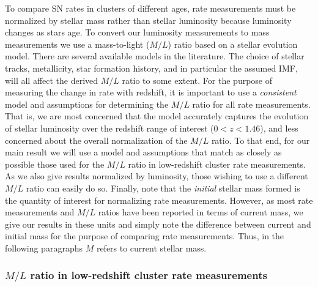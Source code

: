 
To compare SN rates in clusters of different ages, rate measurements
must be normalized by stellar mass rather than stellar luminosity
because luminosity changes as stars age. To convert our luminosity
measurements to mass measurements we use a mass-to-light ($M/L$) ratio
based on a stellar evolution model. There are several available models
in the literature. The choice of stellar tracks, metallicity, star
formation history, and in particular the assumed IMF, will all affect
the derived $M/L$ ratio to some extent. For the purpose of measuring
the change in rate with redshift, it is important to use a
\emph{consistent} model and assumptions for determining the $M/L$
ratio for all rate measurements. That is, we are most concerned that
the model accurately captures the evolution of stellar luminosity over
the redshift range of interest ($0<z<1.46$), and less concerned about
the overall normalization of the $M/L$ ratio. To that end, for our
main result we will use a model and assumptions that match as closely
as possible those used for the $M/L$ ratio in low-redshift cluster
rate measurements. As we also give results normalized by luminosity,
those wishing to use a different $M/L$ ratio can easily do
so. Finally, note that the \emph{initial} stellar mass formed is the
quantity of interest for normalizing rate measurements. However, as
most rate measurements and $M/L$ ratios have been reported in terms of
current mass, we give our results in these units and simply note the
difference between current and initial mass for the purpose of
comparing rate measurements. Thus, in the following paragraphs $M$
refers to current stellar mass.

\subsubsection{$M/L$ ratio in low-redshift cluster rate measurements}

